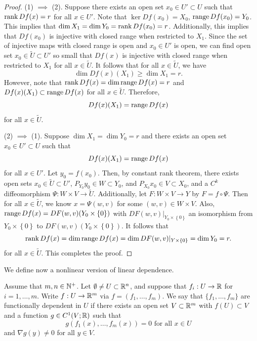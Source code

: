 \documentclass[a4paper]{article}
\begin{document}
\begin{proof}
  {
    \newcommand{\py}{{P_{Y_0}}}
    \newcommand{\pyy}{{P_{Y_1}}}
    \newcommand{\px}{{P_{X_0}}}
    \newcommand{\pxx}{{P_{X_1}}}
    (1) $\implies$ (2). Suppose there exists an open set
    $x_0 \in U' \subset U$ such that $\operatorname{rank} Df(x) = r$
    for all $x \in U'$. Note that $\ker Df(x_0) = X_0$,
    $\operatorname{range} Df(x_0) = Y_0$.
    This implies that $\dim X_1 = \dim Y_0 = \operatorname{rank} Df(x_0) = r$.
    Additionally,
    this implies that $Df(x_0)$ is injective with closed
    range when restricted to $X_1$. Since the set of
    injective maps with closed range is open and
    $x_0 \in U'$ is open, we can find open set
    $x_0 \in \tilde{U} \subset U'$
    so small that $Df(x)$ is injective with closed range
    when restricted to $X_1$ for all $x \in \tilde{U}$.
    It follows that for all $x \in \tilde{U}$, we have
    \[
      \dim Df(x) (X_1) \geq \dim X_1 = r.
    \]
    However, note that $\operatorname{rank} Df(x) = \dim \operatorname{range} Df(x) = r$ and $Df(x)
    (X_1) \subset \operatorname{range} Df(x)$ for all $x \in \tilde{U}$. Therefore,
    \[
      Df(x) (X_1) = \operatorname{range} Df(x)
    \]
    for all $x \in \tilde{U}$.

    (2) $\implies$ (1).
    Suppose $\dim X_1 = \dim Y_0 = r$ and there exists an open
    set $x_0 \in U' \subset U$ such that
    \[
      Df(x)(X_1) = \operatorname{range} Df(x)
    \]
    for all $x \in U'$. Let $y_0 = f(x_0)$. Then, by constant rank
    theorem, there exists open sets $x_0 \in \tilde{U} \subset U'$, $\py
    y_0 \in W \subset Y_0$, and $\px x_0 \in V \subset X_0$, and a $C^k$
    diffeomorphism $\Psi: W \times V \to \tilde{U}$. Additionally, let $F
    : W \times V \to Y$ by $F = f \circ \Psi$. Then for all $x \in
    \tilde{U}$, we know $x = \Psi(w, v)$ for some $(w,v) \in W \times V$.
    Also, $\operatorname{range} Df(x) = DF(w, v)(Y_0 \times \left\{ 0 \right\})$ with
    $DF(w, v) \vert_{Y_0 \times \left\{ 0 \right\}}$ an isomorphism from
    $Y_0 \times \left\{ 0 \right\}$ to $DF(w, v) (Y_0 \times \left\{ 0
    \right\})$. It follows that
    \[
      \operatorname{rank} Df(x) = \dim \operatorname{range} Df(x)
      = \dim DF(w, v) \vert_{Y \times \left\{ 0 \right\}}
      = \dim Y_0 = r.
    \]
    for all $x \in \tilde{U}$. This completes the proof. }

\end{proof}

We define now a nonlinear version of linear dependence.
\begin{defi}
  Assume that $m,n \in \mathbb{N}^+$. Let $\emptyset \neq U \subset \mathbb{R}^n$, and
  suppose that $f_i: U \to \mathbb{R}$ for $i=1,\dots,m$. Write $f: U \to \mathbb{R}^m$
  via $f = (f_1,\dots,f_m)$. We say that $\{f_1,\dots,f_m\}$ are
  functionally dependent in $U$ if there exists an open set $V \subset
    \mathbb{R}^m$ with $f(U) \subset V$ and a function $g \in C^1(V;\mathbb{R})$ such that
  \[
    g(f_1(x),\dots,f_m(x)) =0 \text{ for all } x\in U
  \]
  and $\nabla g(y) \neq 0$ for all $y \in V$.
\end{defi}
\end{document}
